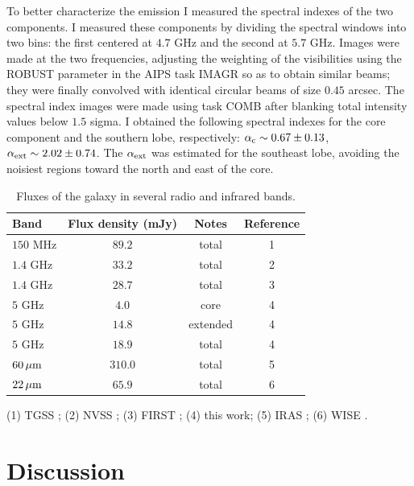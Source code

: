 \documentclass[../main.tex]{subfiles}
\begin{document}
To better characterize the emission I measured the spectral indexes of the two components.
I measured these components by dividing the spectral windows into two bins: the first centered at $4.7$ GHz and the second at $5.7$ GHz.
Images were made at the two frequencies, adjusting the weighting of the visibilities using the ROBUST parameter in the AIPS task IMAGR so as to obtain similar beams; they were finally convolved with identical circular beams of size $0.45$ arcsec. 
The spectral index images were made using task COMB after blanking total intensity values below $1.5$ sigma. 
I obtained the following spectral indexes for the core component and the southern lobe, respectively:  $\alpha_{\rm c} \sim 0.67\pm0.13$,  $\alpha_{\rm ext} \sim 2.02\pm0.74$. 
The $\alpha_{\rm ext}$ was estimated for the southeast lobe, avoiding the noisiest regions toward the north and east of the core.


\begin{table}
\centering
  \begin{threeparttable}
\caption{Fluxes of the galaxy in several radio and infrared bands.}
\label{tab:flux}
\begin{tabular}{lccc}
\hline
Band&Flux density (mJy) &Notes &Reference\\
\hline
$150$ MHz&$89.2$&total&1\\
$1.4$ GHz&$33.2$&total&2\\
$1.4$ GHz&$28.7$&total&3\\
$5$ GHz&$4.0$ & core&4\\
$5$ GHz&$14.8$ & extended&4\\
$5$ GHz&$18.9$ & total&4\\
$60{\,\rm \mu m}$& $310.0$& total &5\\
$22{\,\rm \mu m}$& $65.9$ & total& 6\\
\hline
\end{tabular}
\begin{tablenotes}
\item (1) TGSS \citep{Intema17}; (2) NVSS \citep{Condon98}; (3) FIRST \citep{Becker95}; (4) this work; (5) IRAS \citep{Moshir90}; (6) WISE \citep{Wright10}.
\end{tablenotes}
\end{threeparttable}
\end{table}

\section{Discussion}
\label{sec:discussion}
\end{document}
